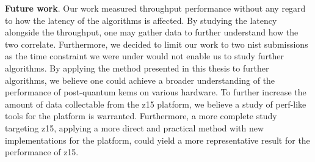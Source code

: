 \noindent\textbf{Future work}. Our work measured throughput performance without any regard to how the latency of the algorithms is affected. By studying the latency alongside the throughput, one may gather data to further understand how the two correlate. Furthermore, we decided to limit our work to two \gls{nist} submissions as the time constraint we were under would not enable us to study further algorithms. By applying the method presented in this thesis to further algorithms, we believe one could achieve a broader understanding of the performance of \gls{post-quantum} \glspl{kem} on various hardware. To further increase the amount of data collectable from the \gls{z15} platform, we believe a study of perf-like tools for the platform is warranted. Furthermore, a more complete study targeting \gls{z15}, applying a more direct and practical method with new implementations for the platform, could yield a more representative result for the performance of \gls{z15}.